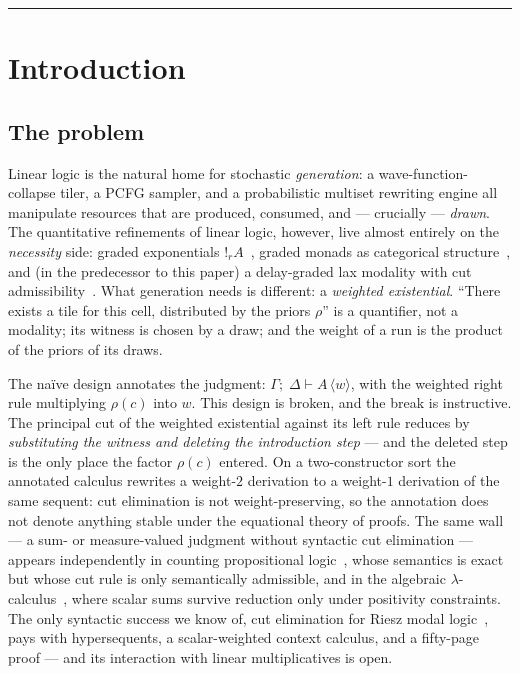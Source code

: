 \documentclass[11pt]{article}
\newcommand{\gbang}[1]{{!}_{#1}}                 %
\newcommand{\seq}[3]{#1;\;#2\vdash #3}             %
\theoremstyle{definition}
\theoremstyle{remark}
\begin{document}
\tableofcontents
\bigskip\hrule\bigskip

\section{Introduction}
\label{sec:intro}

\subsection{The problem}

Linear logic is the natural home for stochastic \emph{generation}: a
wave-function-collapse tiler, a PCFG sampler, and a probabilistic
multiset rewriting engine all manipulate resources that are produced,
consumed, and --- crucially --- \emph{drawn}.  The quantitative
refinements of linear logic, however, live almost entirely on the
\emph{necessity} side: graded exponentials
$\gbang{r}A$~\cite{GirardScedrovScott1992,Atkey2018,OrchardLiepeltEades2019},
graded monads as categorical
structure~\cite{Katsumata2014,FujiiKatsumataMillies2016}, and (in the
predecessor to this paper) a delay-graded lax modality with cut
admissibility~\cite{TillPaper}.  What generation needs is different: a
\emph{weighted existential}.  ``There exists a tile for this cell,
distributed by the priors $\rho$'' is a quantifier, not a modality; its
witness is chosen by a draw; and the weight of a run is the product of
the priors of its draws.

The na\"ive design annotates the judgment:
$\seq{\Gamma}{\Delta}{A\,\langle w\rangle}$, with the weighted right
rule multiplying $\rho(c)$ into $w$.  This design is broken, and the
break is instructive.  The principal cut of the weighted existential
against its left rule reduces by \emph{substituting the witness and
deleting the introduction step} --- and the deleted step is the only
place the factor $\rho(c)$ entered.  On a two-constructor sort the
annotated calculus rewrites a weight-$2$ derivation to a weight-$1$
derivation of the same sequent: cut elimination is not
weight-preserving, so the annotation does not denote anything stable
under the equational theory of proofs.  The same wall --- a sum- or
measure-valued judgment without syntactic cut elimination --- appears
independently in counting propositional logic~\cite{AntonelliDLP2022},
whose semantics is exact but whose cut rule is only semantically
admissible, and in the algebraic $\lambda$-calculus~\cite{Vaux2009},
where scalar sums survive reduction only under positivity constraints.
The only syntactic success we know of, cut elimination for Riesz modal
logic~\cite{LucasMio2022}, pays with hypersequents, a scalar-weighted
context calculus, and a fifty-page proof --- and its interaction with
linear multiplicatives is open.
\end{document}
